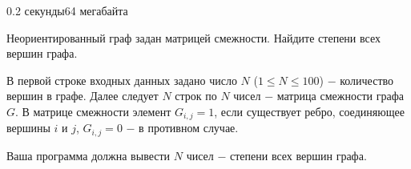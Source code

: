 \begin{problem}{}{}{}{0.2 секунды}{64 мегабайта}

Неориентированный граф задан матрицей смежности. Найдите степени всех вершин графа.

\InputFile
В первой строке входных данных задано число $N$ ($1 \le N \le 100$) $-$ количество вершин в графе.
Далее следует $N$ строк по $N$ чисел $-$ матрица смежности графа $G$. В матрице смежности элемент $G_{i,j}=1$, если
существует ребро, соединяющее вершины $i$ и $j$, $G_{i,j}=0$ $-$ в противном случае.

\OutputFile
Ваша программа должна вывести $N$ чисел $-$ степени всех вершин графа.

\Example
\begin{example}
%
\end{example}

\end{problem}


